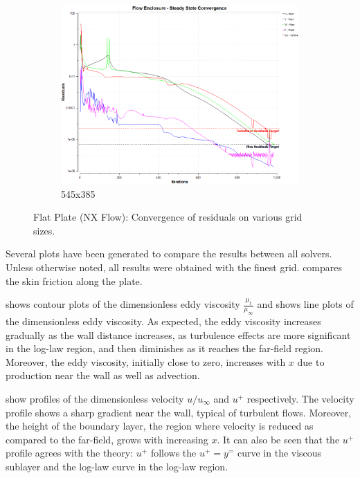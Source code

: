 \begin{figure}[ht!]
\begin{subfigure}{0.48\textwidth}
        \includegraphics[width=\textwidth]{./figs/flatnx/545x385_conv.png}
        \caption{545x385}
    \end{subfigure}
    \caption{Flat Plate (NX Flow): Convergence of residuals on various grid sizes.}
    \label{fig:nxflatcnvstudy}
\end{figure}

Several plots have been generated to compare the results between all solvers. Unless otherwise noted, all results were obtained with the finest grid.  compares the skin friction along the plate.

 shows contour plots of the dimensionless eddy viscosity $\frac{\mu_t}{\mu_{\infty}}$ and  shows line plots of the dimensionless eddy viscosity. As expected, the eddy viscosity increases gradually as the wall distance increases, as turbulence effects are more significant in the log-law region, and then diminishes as it reaches the far-field region. Moreover, the eddy viscosity, initially close to zero, increases with $x$ due to production near the wall as well as advection.

 show profiles of the dimensionless velocity $u/u_\infty$ and $u^+$ respectively. The velocity profile shows a sharp gradient near the wall, typical of turbulent flows. Moreover, the height of the boundary layer, the region where velocity is reduced as compared to the far-field, grows with increasing $x$. It can also be seen that the $u^+$ profile agrees with the theory: $u^+$ follows the $u^+=y^=$ curve in the viscous sublayer and the log-law curve in the log-law region.

